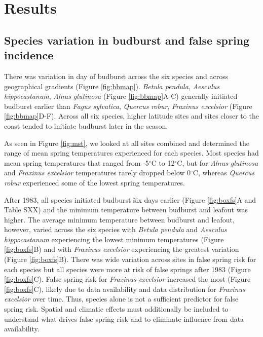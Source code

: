 \documentclass{article}\usepackage[]{graphicx}\usepackage[]{color}
\begin{document}
\section*{Results}
\subsection*{Species variation in budburst and false spring incidence}
There was variation in day of budburst across the six species and across geographical gradients (Figure \ref{fig:bbmap}). \textit{Betula pendula}, \textit{Aesculus hippocastanum}, \textit{Alnus glutinosa} (Figure \ref{fig:bbmap}A-C) generally initiated budburst earlier than \textit{Fagus sylvatica}, \textit{Quercus robur}, \textit{Fraxinus excelsior} (Figure \ref{fig:bbmap}D-F). Across all six species, higher latitude sites and sites closer to the coast tended to initiate budburst later in the season. 

As seen in Figure \ref{fig:mst}, we looked at all sites combined and determined the range of mean spring temperatures experienced for each species. Most species had mean spring temperatures that ranged from -5$^{\circ}$C to 12$^{\circ}$C, but for \textit{Alnus glutinosa} and \textit{Fraxinus excelsior} temperatures rarely dropped below 0$^{\circ}$C, whereas \textit{Quercus robur} experienced some of the lowest spring temperatures. 

After 1983, all species initiated budburst \~six days earlier (Figure \ref{fig:boxfs}A and Table SXX) and the minimum temperature between budburst and leafout was higher.  The average minimum temperature between budburst and leafout, however, varied across the six species with \textit{Betula pendula} and \textit{Aesculus hippocastanum} experiencing the lowest minimum temperatures (Figure \ref{fig:boxfs}B) and with \textit{Fraxinus excelsior} experiencing the greatest variation (Figure \ref{fig:boxfs}B). There was wide variation across sites in false spring risk for each species but all species were more at risk of false springs after 1983 (Figure \ref{fig:boxfs}C). False spring risk for \textit{Fraxinus excelsior} increased the most (Figure \ref{fig:boxfs}C), likely due to data availability and data distribution for \textit{Fraxinus excelsior} over time. Thus, species alone is not a sufficient predictor for false spring risk. Spatial and climatic effects must additionally be included to understand what drives false spring risk and to eliminate influence from data availability. 
\end{document}
